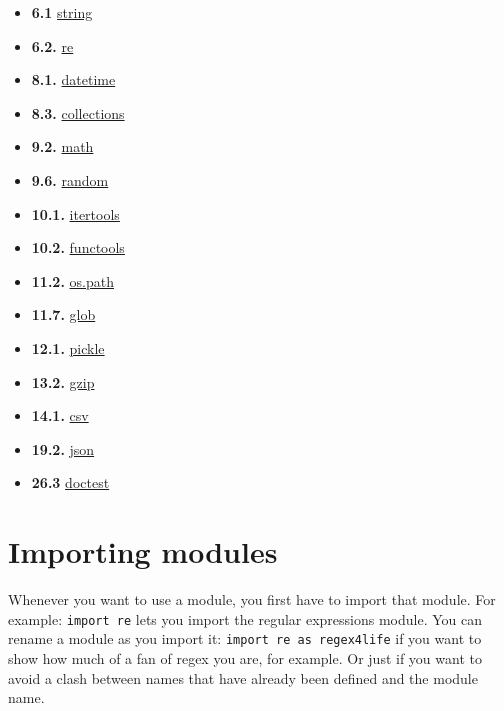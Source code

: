 \documentclass[12pt]{book}
\begin{document}
\begin{itemize}
\item \textbf{6.1} \href{https://docs.python.org/3.5/library/string.html}{string}
\item \textbf{6.2.} \href{https://docs.python.org/3.5/library/re.html}{re}
\item \textbf{8.1.} \href{https://docs.python.org/3.5/library/datetime.html}{datetime}
\item \textbf{8.3.} \href{https://docs.python.org/3.5/library/collections.html}{collections}
\item \textbf{9.2.} \href{https://docs.python.org/3.5/library/math.html}{math}
\item \textbf{9.6.} \href{https://docs.python.org/3.5/library/random.html}{random}
\item \textbf{10.1.} \href{https://docs.python.org/3.5/library/itertools.html}{itertools}
\item \textbf{10.2.} \href{https://docs.python.org/3.5/library/functools.html}{functools}
\item \textbf{11.2.} \href{https://docs.python.org/3.5/library/os.path.html}{os.path}
\item \textbf{11.7.} \href{https://docs.python.org/3.5/library/glob.html}{glob}
\item \textbf{12.1.}  \href{https://docs.python.org/3.5/library/pickle.html}{pickle}
\item \textbf{13.2.} \href{https://docs.python.org/3.5/library/gzip.html}{gzip}
\item \textbf{14.1.} \href{https://docs.python.org/3.5/library/csv.html}{csv}
\item \textbf{19.2.} \href{https://docs.python.org/3.5/library/json.html}{json}
\item \textbf{26.3} \href{https://docs.python.org/3.5/library/doctest.html}{doctest}
\end{itemize}


\section{Importing modules}

Whenever you want to use a module, you first have to import that module. For example: \texttt{import\ re} lets you import the regular expressions module. You can rename a module as you import it: \texttt{import\ re\ as\ regex4life} if you want to show how much of a fan of regex you are, for example. Or just if you want to avoid a clash between names that have already been defined and the module name.
\end{document}
